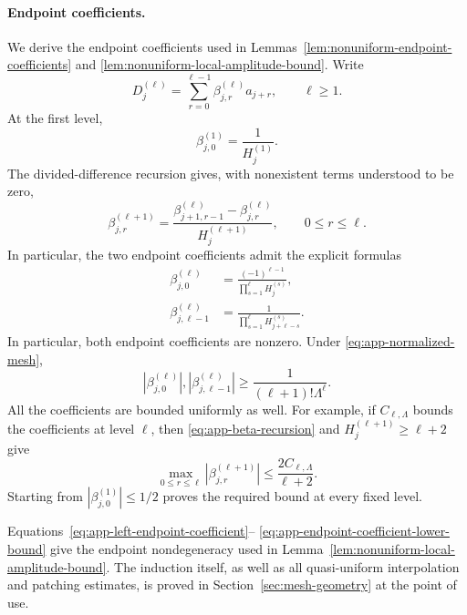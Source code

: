 \documentclass[11pt]{amsart}
\theoremstyle{plain}
\theoremstyle{definition}
\theoremstyle{remark}
\numberwithin{equation}{section}
\theoremstyle{plain}
\begin{document}
\paragraph{Endpoint coefficients.}

We derive the endpoint coefficients used in
Lemmas~\ref{lem:nonuniform-endpoint-coefficients} and
\ref{lem:nonuniform-local-amplitude-bound}.  Write
\begin{equation}\label{eq:app-beta-expansion}
	D_j^{(\ell)}
	=\sum_{r=0}^{\ell-1}\beta_{j,r}^{(\ell)}a_{j+r},
	\qquad \ell\ge1.
\end{equation}
At the first level,
\[
\beta_{j,0}^{(1)}=\frac1{H_j^{(1)}}.
\]
The divided-difference recursion gives, with nonexistent terms understood to
be zero,
\begin{equation}\label{eq:app-beta-recursion}
	\beta_{j,r}^{(\ell+1)}
	=\frac{\beta_{j+1,r-1}^{(\ell)}-
		\beta_{j,r}^{(\ell)}}{H_j^{(\ell+1)}},
	\qquad 0\le r\le\ell.
\end{equation}
In particular, the two endpoint coefficients admit the explicit formulas
\begin{align}
	\beta_{j,0}^{(\ell)}
	&=\frac{(-1)^{\ell-1}}
	{\displaystyle\prod_{s=1}^{\ell}H_j^{(s)}},
	\label{eq:app-left-endpoint-coefficient}\\
	\beta_{j,\ell-1}^{(\ell)}
	&=\frac1{
		\displaystyle\prod_{s=1}^{\ell}H_{j+\ell-s}^{(s)}}.
	\label{eq:app-right-endpoint-coefficient}
\end{align}
In particular, both endpoint coefficients are nonzero.
Under \eqref{eq:app-normalized-mesh},
\begin{equation}\label{eq:app-endpoint-coefficient-lower-bound}
	|\beta_{j,0}^{(\ell)}|,
	|\beta_{j,\ell-1}^{(\ell)}|
	\ge \frac1{(\ell+1)!\Lambda^\ell}.
\end{equation}
All the coefficients are bounded uniformly as well.  For example, if
$C_{\ell,\Lambda}$ bounds the coefficients at level $\ell$, then
\eqref{eq:app-beta-recursion} and $H_j^{(\ell+1)}\ge\ell+2$ give
\[
\max_{0\le r\le\ell}
|\beta_{j,r}^{(\ell+1)}|
\le\frac{2C_{\ell,\Lambda}}{\ell+2}.
\]
Starting from $|\beta_{j,0}^{(1)}|\le1/2$ proves the required bound at every
fixed level.

Equations~\eqref{eq:app-left-endpoint-coefficient}--
\eqref{eq:app-endpoint-coefficient-lower-bound} give the endpoint
nondegeneracy used in Lemma~\ref{lem:nonuniform-local-amplitude-bound}. 
The induction itself, as well as all quasi-uniform interpolation and patching
estimates, is proved in Section~\ref{sec:mesh-geometry} at the point of use.
\end{document}
